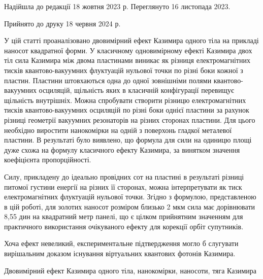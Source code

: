 \documentclass[twoside, 10pt, ptm]{article}
\def\myreceivedukr{Надійшла до редакції 18 жовтня 2023 р. Переглянуто 16 листопада 2023.}
\def\myacceptedukr{Прийнято до друку 18 червня 2024 р.}
\begin{document}
\vspace{3mm}
\centerline{\myreceivedukr}
\centerline{\myacceptedukr}

\vspace{3.5mm}

У цій статті проаналізовано двовимірний ефект Казимира одного тіла
на прикладі наносот квадратної форми.
У класичному одновимірному  ефекті Казимира двох тіл сила Казимира між двома пластинами виникає як різниця електромагнітних тисків
 квантово-вакуумних флуктуацій нульової точки по різні боки кожної з пластин.
Пластини штовхаються одна до одної зовнішніми полями квантово-вакуумних осциляцій, щільність
яких в класичній конфігурації перевищує щільність внутрішніх.
Можна спробувати створити різницю електромагнітних тисків
квантово-вакуумних осциляцій по різні боки однієї пластини
за рахунок різниці геометрії вакуумних резонаторів на різних сторонах пластини.
Для цього необхідно виростити нанокомірки на одній з поверхонь гладкої металевої пластини.
В результаті було виявлено, що формула для сили на одиницю площі дуже схожа на формулу класичного ефекту Казимира,
за винятком значення коефіцієнта пропорційності.

Силу, прикладену до ідеально провідних сот на пластині в результаті
різниці питомої густини енергії на різних її сторонах, можна інтерпретувати
як тиск електромагнітних флуктуацій нульової точки.
Згідно з формулою, представленою в цій роботі, для золотих наносот
розміром близько 2 мкм сила має дорівнювати 8,55 дин на квадратний метр панелі, що є цілком
прийнятним значенням для практичного використання очікуваного ефекту для корекції орбіт супутників.

    Хоча ефект невеликий, експериментальне підтвердження
могло б слугувати вирішальним доказом існування віртуальних квантових фотонів Казимира.

\begin{keywords}
Двовимірний ефект Казимира одного тіла, нанокомірки, наносоти, тяга Казимира\end{keywords}

    
\end{document}
